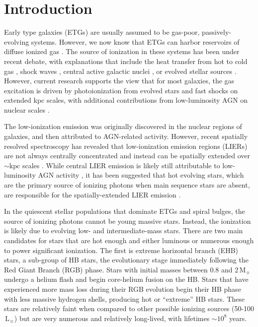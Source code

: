 \documentclass[preprint2]{aastex62}
\newcommand\Lsun{\ensuremath{\,\mathrm{L_{\sun}}}\xspace}
\newcommand\Msun{\ensuremath{\,\mathrm{M_{\sun}}}\xspace}
\begin{document}
\section{Introduction} \label{sec:intro}

Early type galaxies (ETGs) are usually assumed to be gas-poor, passively-evolving systems. However, we now know that ETGs can harbor reservoirs of diffuse ionized gas \citep{Sarzi+2006, Singh+2013, Kehrig+2012, Papaderos+2013}. The source of ionization in these systems has been under recent debate, with explanations that include the heat transfer from hot to cold gas \citep{Heckman+1981}, shock waves \citep{Koski+1976, Dopita+1995, Allen+2008}, central active galactic nuclei \citep[AGN; ][]{Ferland+1983, Halpern+1983, Heckman+1998, Ho+1999, Kauffmann+2003b, Kewley+2006, Ho+2009}, or evolved stellar sources \citep{Binette+1994, Taniguchi+2000}. However, current research supports the view that for most galaxies, the gas excitation is driven by photoionization from evolved stars and fast shocks on extended kpc scales, with additional contributions from low-luminosity AGN on nuclear scales \citep[e.g., ][]{Pandya+2017}.

The low-ionization emission was originally discovered in the nuclear regions of galaxies, and then attributed to AGN-related activity. However, recent spatially resolved spectroscopy has revealed that low-ionization emission regions (LIERs) are not always centrally concentrated and instead can be spatially extended over ${\sim}\mathrm{kpc}$ scales \citep{Belfiore+2016, James+2015, Gomes+2016}. While central LIER emission is likely still attributable to low-luminosity AGN activity \citep{Sarzi+2010, Belfiore+2016, Kormendy+2013, Pandya+2017}, it has been suggested that hot evolving stars, which are the primary source of ionizing photons when main sequence stars are absent, are responsible for the spatially-extended LIER emission \citep{Binette+1994, Stasinska+2008,Sarzi+2010, Yan+2012, Woods+2014, Johansson+2016}.

In the quiescent stellar populations that dominate ETGs and spiral bulges, the source of ionizing photons cannot be young massive stars. Instead, the ionization is likely due to evolving low- and intermediate-mass stars. There are two main candidates for stars that are hot enough and either luminous or numerous enough to power significant ionization. The first is extreme horizontal branch (EHB) stars, a sub-group of HB stars, the evolutionary stage immediately following the Red Giant Branch (RGB) phase. Stars with initial masses between 0.8 and 2\Msun undergo a helium flash and begin core-helium fusion on the HB. Stars that have experienced more mass loss during their RGB evolution begin their HB phase with less massive hydrogen shells, producing hot or ``extreme'' HB stars. These stars are relatively faint when compared to other possible ionizing sources (50-100\Lsun) but are very numerous and relatively long-lived, with lifetimes $\sim 10^8$ years. 
\end{document}
